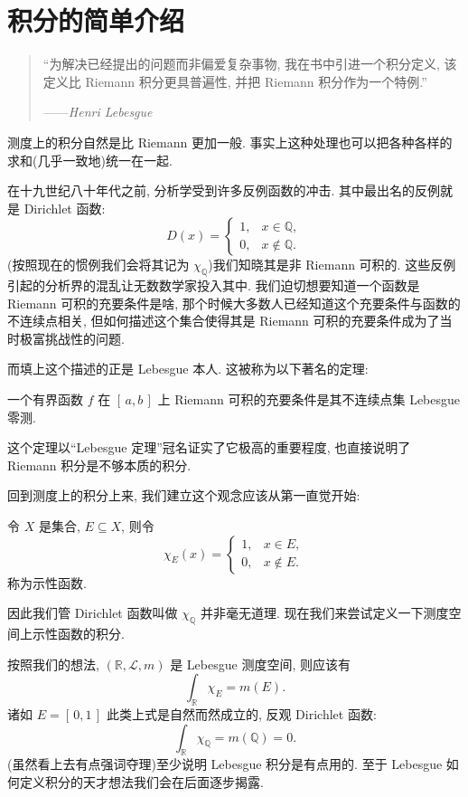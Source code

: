 \section{积分的简单介绍}
\begin{quote}
    ``为解决已经提出的问题而非偏爱复杂事物, 我在书中引进一个积分定义, 该定义比 Riemann 积分更具普遍性, 并把 Riemann 积分作为一个特例.''\par\hfill ------\emph{Henri Lebesgue}
\end{quote}

测度上的积分自然是比 Riemann 更加一般. 事实上这种处理也可以把各种各样的求和(几乎一致地)统一在一起.

在十九世纪八十年代之前, 分析学受到许多反例函数的冲击. 其中最出名的反例就是 Dirichlet 函数:
\[
    D(x) = \begin{cases}
        1, & x\in\mathbb Q,    \\
        0, & x\notin\mathbb Q.
    \end{cases}
\]
(按照现在的惯例我们会将其记为 $\chi_{\mathbb Q}$)我们知晓其是非 Riemann 可积的. 这些反例引起的分析界的混乱让无数数学家投入其中. 我们迫切想要知道一个函数是 Riemann 可积的充要条件是啥, 那个时候大多数人已经知道这个充要条件与函数的不连续点相关, 但如何描述这个集合使得其是 Riemann 可积的充要条件成为了当时极富挑战性的问题\enote.

而填上这个描述的正是 Lebesgue 本人. 这被称为以下著名的定理:
\begin{theorem}[Lebesgue 定理]
    一个有界函数 $f$ 在 $[\,a,b\,]$ 上 Riemann 可积的充要条件是其不连续点集 Lebesgue 零测.
\end{theorem}
这个定理以``Lebesgue 定理''冠名证实了它极高的重要程度, 也直接说明了 Riemann 积分是不够本质的积分.

回到测度上的积分上来, 我们建立这个观念应该从第一直觉开始:
\begin{defi}[示性函数]
    令 $X$ 是集合, $E\subseteq X$, 则令
    \[
        \chi_E(x) =\begin{cases}
            1, & x\in E,    \\
            0, & x\notin E.
        \end{cases}
    \]
    称为示性函数.
\end{defi}
因此我们管 Dirichlet 函数叫做 $\chi_{\mathbb Q}$ 并非毫无道理. 现在我们来尝试定义一下测度空间上示性函数的积分.

按照我们的想法, $(\mathbb R,\mathcal L,m)$ 是 Lebesgue 测度空间, 则应该有
\[
    \int_{\mathbb R}\chi_{E} = m(E).
\]
诸如 $E=[\,0,1\,]$ 此类上式是自然而然成立的, 反观 Dirichlet 函数:
\[
    \int_{\mathbb R}\chi_{\mathbb Q} = m(\mathbb Q) = 0
    .\]
(虽然看上去有点强词夺理)至少说明 Lebesgue 积分是有点用的. 至于 Lebesgue 如何定义积分的天才想法我们会在后面逐步揭露.

